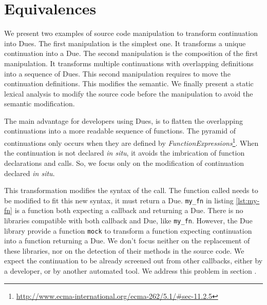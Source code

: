 \section{Equivalences} \label{section:equivalences}

We present two examples of source code manipulation to transform continuation into Dues.
The first manipulation is the simplest one.
It transforms a unique continuation into a Due.
The second manipulation is the composition of the first manipulation.
It transforms multiple continuations with overlapping definitions into a sequence of Dues.
This second manipulation requires to move the continuation definitions.
This modifies the semantic.
We finally present a static lexical analysis to modify the source code before the manipulation to avoid the semantic modification.

The main advantage for developers using Dues, is to flatten the overlapping continuations into a more readable sequence of functions.
The pyramid of continuations only occurs when they are defined by \textit{FunctionExpressions}\footnote{\url{http://www.ecma-international.org/ecma-262/5.1/\#sec-11.2.5}}.
When the continuation is not declared \textit{in situ}, it avoids the imbrication of function declarations and calls.
So, we focus only on the modification of continuation declared \textit{in situ}.

This transformation modifies the syntax of the call.
The function called needs to be modified to fit this new syntax, it must return a Due.
\texttt{my_fn} in listing \ref{lst:my-fn} is a function both expecting a callback and returning a Due.
There is no libraries compatible with both callback and Due, like \texttt{my_fn}.
However, the Due library provide a function \texttt{mock} to transform a function expecting continuation into a function returning a Due.
We don't focus neither on the replacement of these libraries, nor on the detection of their methods in the source code.
We expect the continuation to be already screened out from other callbacks, either by a developer, or by another automated tool.
We address this problem in section \label{section:compiler:lib-compilation}.


